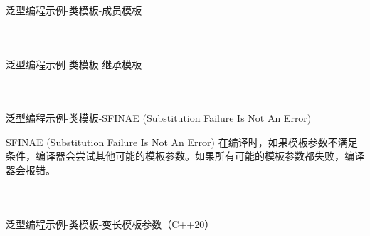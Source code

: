 \documentclass[UTF8,aspectratio=169]{beamer}
\begin{document}
\begin{frame}[fragile]{泛型编程示例-类模板-成员模板}
    \begin{columns}
        \begin{column}{0.48\textwidth}
            \inputminted[firstline=1,lastline=16]{cpp}{code/gp_class_template_7.cpp}
        \end{column}
        \begin{column}{0.48\textwidth}
            \inputminted[firstline=18,lastline=36]{cpp}{code/gp_class_template_7.cpp}
        \end{column}
    \end{columns}
\end{frame}

\begin{frame}[fragile]{泛型编程示例-类模板-继承模板}
    \begin{columns}
        \begin{column}{0.48\textwidth}
            \inputminted[firstline=1,lastline=18]{cpp}{code/gp_class_template_8.cpp}
        \end{column}
        \begin{column}{0.48\textwidth}
            \inputminted[firstline=19,lastline=35]{cpp}{code/gp_class_template_8.cpp}
        \end{column}
    \end{columns}
\end{frame}

\begin{frame}[fragile]{泛型编程示例-类模板-SFINAE (Substitution Failure Is Not An Error)}
    \begin{ytublock}{SFINAE (Substitution Failure Is Not An Error)}
        在编译时，如果模板参数不满足条件，编译器会尝试其他可能的模板参数。如果所有可能的模板参数都失败，编译器会报错。
    \end{ytublock}
    \begin{columns}
        \begin{column}{0.48\textwidth}
            \inputminted[firstline=1,lastline=13]{cpp}{code/gp_class_template_9.cpp}
        \end{column}
        \begin{column}{0.48\textwidth}
            \inputminted[firstline=14,lastline=26]{cpp}{code/gp_class_template_9.cpp}
        \end{column}
    \end{columns}
\end{frame}

\begin{frame}[fragile]{泛型编程示例-类模板-变长模板参数（C++20）}
    \begin{columns}
        \begin{column}{0.48\textwidth}
            \inputminted[firstline=1,lastline=18]{cpp}{code/gp_class_template_10.cpp}
        \end{column}
        \begin{column}{0.48\textwidth}
            \inputminted[firstline=19,lastline=40]{cpp}{code/gp_class_template_10.cpp}
        \end{column}
    \end{columns}
\end{frame}
\end{document}
